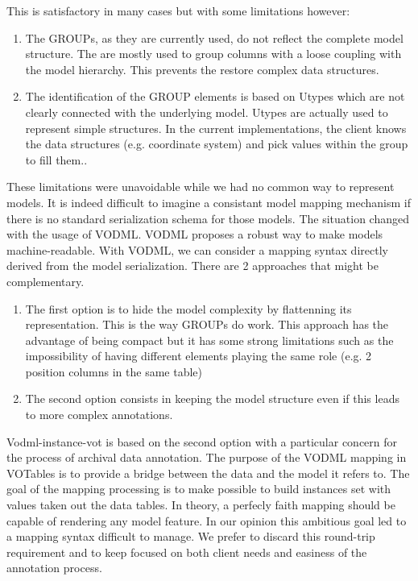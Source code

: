 \documentclass[11pt,a4paper]{ivoa}
\begin{document}
This is satisfactory in many cases but with some limitations however:\begin{enumerate}
   \item The GROUPs, as they are currently used, do not reflect the complete model structure. The are mostly used to group columns with a loose coupling with the model hierarchy. This prevents the restore complex data structures.
   \item The identification of the GROUP elements is based on Utypes which are not clearly connected with the underlying model. Utypes are actually used to represent simple structures. In the current implementations, the client knows the data structures (e.g. coordinate system) and pick values within the group to fill them..
\end{enumerate}
These limitations were unavoidable while we had no common way to represent  models. It is indeed difficult to imagine a consistant model mapping mechanism if there is no standard serialization schema for those models. The situation changed with the usage of VODML. VODML proposes a robust way to make models machine-readable. With VODML, we can consider a mapping syntax directly derived from the model serialization. There are 2 approaches that might be complementary. 
\begin{enumerate}
   \item The first option is to hide the model complexity by flattenning its representation. This is the way GROUPs do work. This approach has the advantage of being compact but it has some strong limitations such as the impossibility of having different elements playing the same role (e.g. 2 position columns in the same table)
   \item The second option consists in keeping the model structure even if this leads to more complex annotations.
\end{enumerate}


Vodml-instance-vot is based on the second option with a particular concern for the process of archival data annotation. The purpose of the VODML mapping in VOTables is to provide a bridge between the data and the model it refers to. The goal of the mapping processing is to make possible to build instances set with values taken out the data tables. In theory, a perfecly faith mapping should be capable of rendering any model feature. In our opinion this ambitious goal led to a mapping syntax difficult to manage.
We prefer to discard this round-trip requirement and to keep focused on both client needs and easiness of the annotation process.
\end{document}
